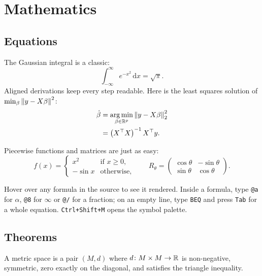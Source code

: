 \chapter{Mathematics}
\label{chap:mathematics}

\section{Equations}

The Gaussian integral is a classic:
\begin{equation}
  \int_{-\infty}^{\infty} e^{-x^2}\,\mathrm{d}x = \sqrt{\pi}.
  \label{eq:gauss}
\end{equation}
Aligned derivations keep every step readable. Here is the least squares
solution of $\min_{\beta} \left\lVert y - X\beta \right\rVert^2$:
\begin{align}
  \hat\beta &= \operatorname*{arg\,min}_{\beta \in \mathbb{R}^p} \left\lVert y - X\beta \right\rVert_2^2 \label{eq:ls} \\
            &= \left(X^\top X\right)^{-1} X^\top y. \nonumber
\end{align}

Piecewise functions and matrices are just as easy:
\[
  f(x) = \begin{cases}
    x^2        & \text{if } x \ge 0,\\
    -\sin x    & \text{otherwise,}
  \end{cases}
  \qquad
  R_\theta = \begin{pmatrix}
    \cos\theta & -\sin\theta \\
    \sin\theta & \cos\theta
  \end{pmatrix}.
\]

\begin{tryit}
  Hover over any formula in the source to see it rendered. Inside a formula,
  type \texttt{@a} for $\alpha$, \texttt{@8} for $\infty$ or \texttt{@/} for a
  fraction; on an empty line, type \texttt{BEQ} and press \texttt{Tab} for a whole
  equation. \texttt{Ctrl+Shift+M} opens the symbol palette.
\end{tryit}

\section{Theorems}

\begin{definition}
  A metric space is a pair $(M, d)$ where $d \colon M \times M \to \mathbb{R}$ is
  non-negative, symmetric, zero exactly on the diagonal, and satisfies the
  triangle inequality.
\end{definition}

